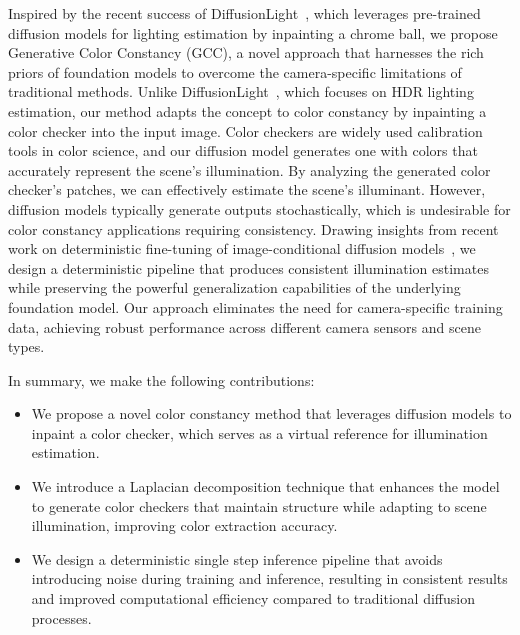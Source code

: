 Inspired by the recent success of DiffusionLight~\cite{phongthawee2024diffusionlight}, which leverages pre-trained diffusion models for lighting estimation by inpainting a chrome ball, we propose Generative Color Constancy (GCC), a novel approach that harnesses the rich priors of foundation models to overcome the camera-specific limitations of traditional methods. Unlike DiffusionLight~\cite{phongthawee2024diffusionlight}, which focuses on HDR lighting estimation, our method adapts the concept to color constancy by inpainting a color checker into the input image. Color checkers are widely used calibration tools in color science, and our diffusion model generates one with colors that accurately represent the scene's illumination. By analyzing the generated color checker's patches, we can effectively estimate the scene's illuminant. However, diffusion models typically generate outputs stochastically, which is undesirable for color constancy applications requiring consistency. Drawing insights from recent work on deterministic fine-tuning of image-conditional diffusion models~\cite{garcia2024fine}, we design a deterministic pipeline that produces consistent illumination estimates while preserving the powerful generalization capabilities of the underlying foundation model. Our approach eliminates the need for camera-specific training data, achieving robust performance across different camera sensors and scene types.

In summary, we make the following contributions:
\begin{itemize}
    \item We propose a novel color constancy method that leverages diffusion models to inpaint a color checker, which serves as a virtual reference for illumination estimation.
    
    \item We introduce a Laplacian decomposition technique that enhances the model to generate color checkers that maintain structure while adapting to scene illumination, improving color extraction accuracy.
    
    \item We design a deterministic single step inference pipeline that avoids introducing noise during training and inference, resulting in consistent results and improved computational efficiency compared to traditional diffusion processes.
\end{itemize}




